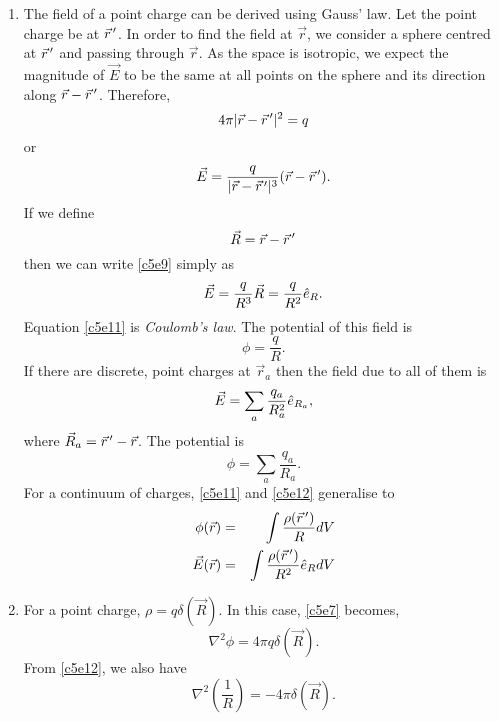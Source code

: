 \begin{enumerate}
\item The field of a point charge can be derived using Gauss' law. Let the point
charge be at $\vec{r}^{\,\prime}$. In order to find the field at $\vec{r}$, we consider
a sphere centred at $\vec{r}^{\,\prime}$ and passing through $\vec{r}$. As the space is
isotropic, we expect the magnitude of $\vec{E}$ to be the same at all points on the
sphere and its direction along $\vec{r} - \vec{r}^{\,\prime}$. Therefore,
\[
4\pi |\vec{r} - \vec{r}^{\,\prime}|^2 = q
\]
or
\begin{equation}\label{c5e9}
\vec{E} = \frac{q}{|\vec{r} - \vec{r}^{\,\prime}|^3}(\vec{r} - \vec{r}^{\,\prime}).
\end{equation}
If we define
\begin{equation}\label{c5e10}
\vec{R} = \vec{r} - \vec{r}^{\,\prime}
\end{equation}
then we can write \eqref{c5e9} simply as
\begin{equation}\label{c5e11}
\vec{E} = \frac{q}{R^3}\vec{R} = \frac{q}{R^2}\hat{e}_{R}.
\end{equation}
Equation \eqref{c5e11} is \emph{Coulomb's law}. The potential of this field is
\begin{equation}\label{c5e12}
\phi = \frac{q}{R}.
\end{equation}
If there are discrete, point charges at $\vec{r}_a$ then the field due to all of 
them is
\begin{equation}\label{c5e13}
\vec{E} = \sum_a \frac{q_a}{R_a^2}\hat{e}_{R_a},
\end{equation}
where $\vec{R}_a = \vec{r}^{\,\prime} - \vec{r}$. The potential is
\begin{equation}\label{c5e14}
\phi = \sum_a\frac{q_a}{R_a}.
\end{equation}
For a continuum of charges, \eqref{c5e11} and \eqref{c5e12} generalise to
\begin{eqnarray}
\phi(\vec{r}) &=& \int\frac{\rho(\vec{r}^{\,\prime})}{R}dV \label{c5e15} \\
\vec{E}(\vec{r}) &=& \int\frac{\rho(\vec{r}^{\,\prime})}{R^2}\hat{e}_{R}dV  \label{c5e16}
\end{eqnarray}

\item For a point charge, $\rho = q\delta(\vec{R})$. In this case, \eqref{c5e7}
becomes,
\[
\nabla^2\phi = 4\pi q\delta(\vec{R}).
\]
From \eqref{c5e12}, we also have
\begin{equation}\label{c5e17}
\nabla^2\left(\frac{1}{R}\right) = -4\pi\delta(\vec{R}).
\end{equation}


\end{enumerate}
